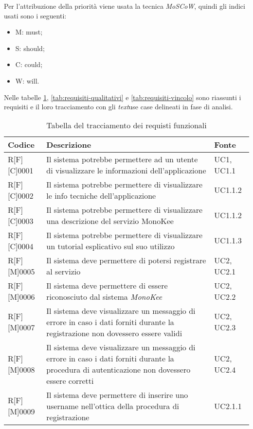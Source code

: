 Per l’attribuzione della priorità viene usata la tecnica \textit{MoSCoW}, quindi gli indici usati sono i seguenti:
\begin{itemize}
    \item M: must;
    \item S: should; 
    \item C: could; 
    \item W: will.
\end{itemize} 
    
Nelle tabelle \ref{tab:requisiti-funzionali}, \ref{tab:requisiti-qualitativi} e \ref{tab:requisiti-vincolo} sono riassunti i requisiti e il loro tracciamento con gli \textit{text}use case delineati in fase di analisi.

\newpage
\begin{center}
\begin{longtable}{|p{2cm}|p{9cm}|p{2cm}|}%
\caption{Tabella del tracciamento dei requisti funzionali}
\label{tab:requisiti-funzionali}
\endfirsthead
\endhead
\hline
\textbf{Codice} & \textbf{Descrizione} & \textbf{Fonte}\\
\hline
R[F][C]0001     & Il sistema potrebbe permettere ad un utente di visualizzare le informazioni dell’applicazione & UC1, UC1.1 \\
\hline
R[F][C]0002     & Il sistema potrebbe permettere di visualizzare le info tecniche dell’applicazione & UC1.1.2 \\
\hline
R[F][C]0003     & Il sistema potrebbe permettere di visualizzare una descrizione del servizio MonoKee & UC1.1.2 \\
\hline
R[F][C]0004     & Il sistema potrebbe permettere di visualizzare un tutorial esplicativo sul suo utilizzo & UC1.1.3 \\
\hline
R[F][M]0005     & Il sistema deve permettere di potersi registrare al servizio & UC2, UC2.1 \\
\hline
R[F][M]0006     & Il sistema deve permettere di essere riconosciuto dal sistema \textit{MonoKee} & UC2, UC2.2 \\
\hline
R[F][M]0007     & Il sistema deve visualizzare un messaggio di errore in caso i dati forniti durante la registrazione non dovessero essere validi & UC2, UC2.3 \\
\hline
R[F][M]0008     & Il sistema deve visualizzare un messaggio di errore in caso i dati forniti durante la procedura di autenticazione non dovessero essere corretti & UC2, UC2.4 \\
\hline
R[F][M]0009     & Il sistema deve permettere di inserire uno username nell’ottica della procedura di registrazione  & UC2.1.1\\

\end{longtable}
\end{center}
